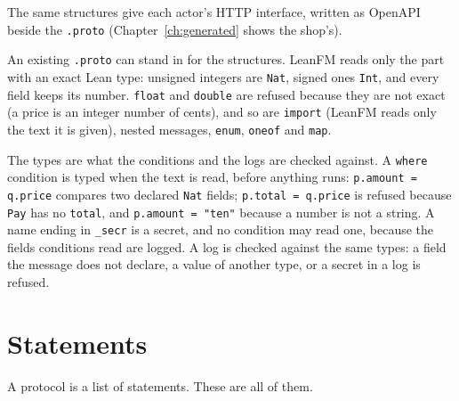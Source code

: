 

The same structures give each actor's HTTP interface, written as OpenAPI beside
the \texttt{.proto} (Chapter~\ref{ch:generated} shows the shop's).

An existing \texttt{.proto} can stand in for the structures. LeanFM reads only the
part with an exact Lean type: unsigned integers are \texttt{Nat}, signed ones
\texttt{Int}, and every field keeps its number. \texttt{float} and
\texttt{double} are refused because they are not exact (a price is an integer
number of cents), and so are \texttt{import} (LeanFM reads only the text it is
given), nested messages, \texttt{enum}, \texttt{oneof} and \texttt{map}.

The types are what the conditions and the logs are checked against. A
\texttt{where} condition is typed when the text is read, before anything runs:
\texttt{p.amount = q.price} compares two declared \texttt{Nat} fields;
\texttt{p.total = q.price} is refused because \texttt{Pay} has no
\texttt{total}, and \texttt{p.amount = "ten"} because a number is not a string. A
name ending in \texttt{\_secr} is a secret, and no condition may read one,
because the fields conditions read are logged. A log is checked against the same
types: a field the message does not declare, a value of another type, or a secret
in a log is refused.

\section{Statements}

A protocol is a list of statements. These are all of them.

